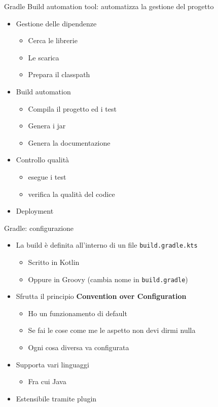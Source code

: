 \documentclass[presentation]{beamer}
\begin{document}
\begin{frame}{Gradle}
    Build automation tool: automatizza la gestione del progetto
    \begin{itemize}
        \item Gestione delle dipendenze
        \begin{itemize}
            \item Cerca le librerie
            \item Le scarica
            \item Prepara il classpath
        \end{itemize}
        \item Build automation
        \begin{itemize}
            \item Compila il progetto ed i test
            \item Genera i jar
            \item Genera la documentazione
        \end{itemize}
        \item Controllo qualità
        \begin{itemize}
            \item esegue i test
            \item verifica la qualità del codice
        \end{itemize}
        \item Deployment
    \end{itemize}
\end{frame}

\begin{frame}[allowframebreaks]{Gradle: configurazione}
    \begin{itemize}
        \item La build è definita all'interno di un file \texttt{build.gradle.kts} 
        \begin{itemize}
            \item Scritto in Kotlin 
            \item Oppure in Groovy (cambia nome in \texttt{build.gradle})
        \end{itemize}
        \item Sfrutta il principio \textbf{Convention over Configuration}
        \begin{itemize}
            \item Ho un funzionamento di default
            \item Se fai le cose come me le aspetto non devi dirmi nulla
            \item Ogni cosa diversa va configurata
        \end{itemize}
        \item Supporta vari linguaggi
        \begin{itemize}
            \item Fra cui Java
        \end{itemize}
        \item Estensibile tramite plugin
    \end{itemize}
\end{frame}
\end{document}
